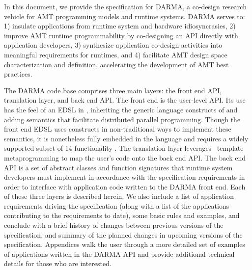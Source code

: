 
In this document, we provide the specification for \gls{DARMA}, 
a co-design research vehicle for \gls{AMT} \glspl{programming model} and
\glspl{runtime system}.  \gls{DARMA} serves to:
1) insulate applications from \gls{runtime system} and hardware idiosyncrasies,
2) improve \gls{AMT} runtime programmability by co-designing an \gls{API} directly with
  application developers, 3) synthesize application \gls{co-design} activities into
  meaningful requirements for runtimes, and 4) 
facilitate \gls{AMT} design space characterization and definition, accelerating the
development of \gls{AMT} best practices.

The \gls{DARMA} code base comprises three main layers: the \gls{front end} \gls{API},
\gls{translation layer}, and \gls{back end} \gls{API}.  
The \gls{front end} is the user-level \gls{API}. 
Its use has the feel of an \gls{EDSL} in \CC,  inheriting the generic
language constructs of \CC and adding \gls{semantics} that facilitate
distributed parallel programming. Though the \gls{front end} \gls{EDSL} uses
\CC constructs in non-traditional ways to implement these semantics, it is
nonetheless fully embedded in the \CC language and
requires a widely supported subset of \CC{}14 functionality \compilerReqs.
The \gls{translation layer} leverages \CC\ \gls{template
metaprogramming} to map the user's code onto the \gls{back end} \gls{API}.
The \gls{back end} \gls{API} is a set of abstract classes and function
signatures that \gls{runtime system} developers must implement in accordance with the
specification requirements in order to interface with application code written
to the \gls{DARMA} front end.  
Each of these three layers is described herein. We also
include a list of application requirements driving the specification (along
with a list of the applications contributing to the requirements to date), some basic rules 
and examples, and conclude with a brief history of changes between previous
versions of the specification, and summary of the planned changes in upcoming
versions of the specification.  Appendices walk the user through a more detailed set
of examples of applications written in the \gls{DARMA} \gls{API} and provide
additional technical details for those who are interested.

